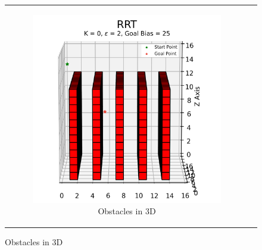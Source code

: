 \begin{figure}[H]
\begin{centering}
\begin{tabular}{cc}
    \begin{subfigure}{0.47\linewidth}
    \includegraphics[width=\linewidth]{chapters/chapter2/img/visualizing/obstacles3d.png}
    \caption{Obstacles in 3D}
    \end{subfigure} \\

\end{tabular}
\label{fig:rrt_obstacles}
\end{centering}
\end{figure}